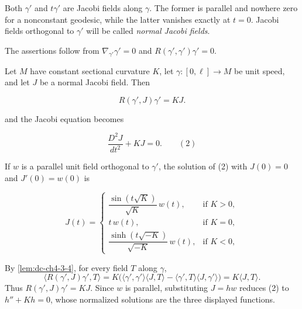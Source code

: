 \begin{remark}
  \label{rem:dc-ch5-2-2}
  \leanok
  Both $\gamma'$ and $t\gamma'$ are Jacobi fields along $\gamma$. The former is
  parallel and nowhere zero for a nonconstant geodesic, while the latter
  vanishes exactly at $t=0$. Jacobi fields orthogonal to $\gamma'$ will be called
  \emph{normal Jacobi fields}.

  \sketch
  The assertions follow from $\nabla_{\gamma'}\gamma'=0$ and
  $R(\gamma',\gamma')\gamma'=0$.
\end{remark}

\begin{example}
  \label{ex:dc-ch5-2-3}
  \leanok
  Let $M$ have constant sectional curvature $K$, let
  $\gamma:[0,\ell]\to M$ be unit speed, and let $J$ be a normal Jacobi field.
  Then
  
  $$
  R(\gamma',J)\gamma'=KJ.
  $$
  
  and the Jacobi equation becomes

  $$
  \frac{D^2 J}{dt^2}+KJ=0.\qquad(2)
  $$

  If $w$ is a parallel unit field orthogonal to $\gamma'$, the solution of (2)
  with $J(0)=0$ and $J'(0)=w(0)$ is
  
  $$
  J(t)=\begin{cases}\dfrac{\sin(t\sqrt{K})}{\sqrt{K}}\,w(t),&\text{if }K>0,\\[1ex] t\,w(t),&\text{if }K=0,\\[1ex]\dfrac{\sinh(t\sqrt{-K})}{\sqrt{-K}}\,w(t),&\text{if }K<0,\end{cases}
  $$
  

  \sketch
  By \cref{lem:dc-ch4-3-4}, for every field $T$ along $\gamma$,
  $$
  \langle R(\gamma',J)\gamma',T\rangle
  =K\big(\langle\gamma',\gamma'\rangle\langle J,T\rangle
  -\langle\gamma',T\rangle\langle J,\gamma'\rangle\big)
  =K\langle J,T\rangle.
  $$
  Thus $R(\gamma',J)\gamma'=KJ$. Since $w$ is parallel, substituting
  $J=h w$ reduces (2) to $h''+Kh=0$, whose normalized solutions are the three
  displayed functions.
\end{example}

